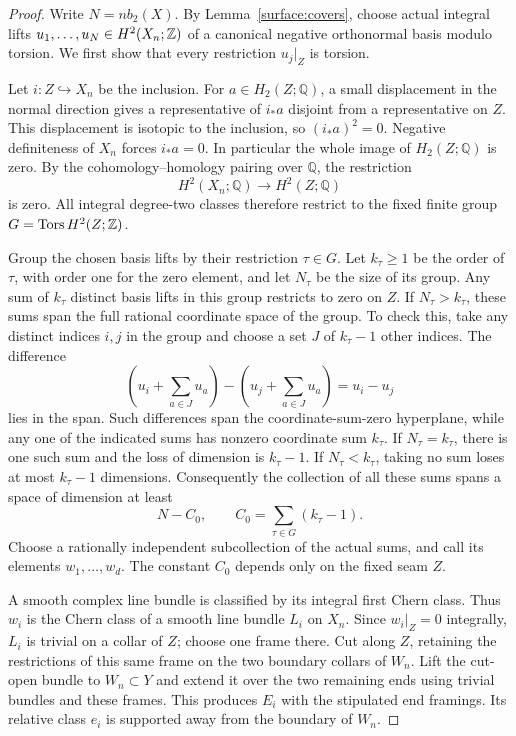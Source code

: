\begin{proof}
Write $N=n b_2(X)$. By Lemma~\ref{surface:covers}, choose actual integral
lifts $u_1,\ldots,u_N\in H^2(X_n;\mathbb Z)$ of a canonical negative
orthonormal basis modulo torsion. We first show that every restriction
$u_j|_Z$ is torsion.

Let $i:Z\hookrightarrow X_n$ be the inclusion. For
$a\in H_2(Z;\mathbb Q)$, a small displacement in the normal direction gives
a representative of $i_*a$ disjoint from a representative on $Z$.
This displacement is isotopic to the inclusion, so
$(i_*a)^2=0$. Negative definiteness of $X_n$ forces $i_*a=0$.
In particular the whole image of $H_2(Z;\mathbb Q)$ is zero. By the
cohomology--homology pairing over $\mathbb Q$, the restriction
\[
 H^2(X_n;\mathbb Q)\longrightarrow H^2(Z;\mathbb Q)
\]
is zero. All integral degree-two classes therefore restrict to the fixed
finite group
$G=\operatorname{Tors}H^2(Z;\mathbb Z)$.

Group the chosen basis lifts by their restriction $\tau\in G$.
Let $k_\tau\geq1$ be the order of $\tau$, with order one for the zero
element, and let $N_\tau$ be the size of its group. Any sum of
$k_\tau$ distinct basis lifts in this group restricts to zero on $Z$.
If $N_\tau>k_\tau$, these sums span the full rational coordinate space
of the group. To check this, take any distinct indices $i,j$ in the
group and choose a set $J$ of $k_\tau-1$ other indices. The difference
\[
 \left(u_i+\sum_{a\in J}u_a\right)
 -\left(u_j+\sum_{a\in J}u_a\right)=u_i-u_j
\]
lies in the span. Such differences span the coordinate-sum-zero
hyperplane, while any one of the indicated sums has nonzero coordinate
sum $k_\tau$. If $N_\tau=k_\tau$, there is one such sum and the loss
of dimension is $k_\tau-1$. If $N_\tau<k_\tau$, taking no sum loses
at most $k_\tau-1$ dimensions. Consequently the collection of all these
sums spans a space of dimension at least
\[
 N-C_0,\qquad C_0=\sum_{\tau\in G}(k_\tau-1).
\]
Choose a rationally independent subcollection of the actual sums, and
call its elements $w_1,\ldots,w_d$. The constant $C_0$ depends only on
the fixed seam $Z$.

A smooth complex line bundle is classified by its integral first Chern
class. Thus $w_i$ is the Chern class of a smooth line bundle $L_i$ on
$X_n$. Since $w_i|_Z=0$ integrally, $L_i$ is trivial on a collar of
$Z$; choose one frame there. Cut along $Z$, retaining the restrictions
of this same frame on the two boundary collars of $W_n$. Lift the
cut-open bundle to $W_n\subset Y$ and extend it over the two remaining
ends using trivial bundles and these frames. This produces $E_i$ with
the stipulated end framings. Its relative class $e_i$ is supported away
from the boundary of $W_n$.


\end{proof}
